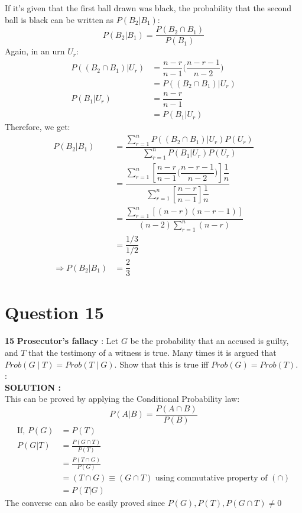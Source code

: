 \documentclass{article}
\begin{document}
If it's given that the first ball drawn was black, the probability that the second ball is black can be written as $P(B_2|B_1)$:
$$P(B_2|B_1) = \frac{P(B_2\cap B_1)}{P(B_1)}$$
Again, in an urn $U_r$:
\begin{align*}
P((B_2\cap B_1)|U_r)&=\dfrac{n-r}{n-1}\Big(\dfrac{n-r-1}{n-2}\Big)\\
&=P((B_2\cap B_1)|U_r)\\
P(B_1|U_r)&=\dfrac{n-r}{n-1}\\
&=P(B_1|U_r)
\end{align*}
Therefore, we get:
\begin{align*}
    P(B_2|B_1)&=\dfrac{\sum^n_{r=1}P((B_2\cap B_1)|U_r)P(U_r)}{\sum^n_{r=1}P(B_1|U_r)P(U_r)}\\
    &=\dfrac{\sum^n_{r=1}\left[\dfrac{n-r}{n-1}\Big(\dfrac{n-r-1}{n-2}\Big)\right]\dfrac{1}{n}}{\sum^n_{r=1}\left[\dfrac{n-r}{n-1}\right]\dfrac{1}{n}}\\
    &=\dfrac{\sum^n_{r=1}\left[(n-r)(n-r-1)\right]}{(n-2)\sum^n_{r=1}(n-r)}\\
    &=\dfrac{1/3}{1/2}\\
  \Rightarrow P(B_2|B_1)&=\dfrac{2}{3}
\end{align*}


\section{Question 15}
\label{Q15}
\textbf{15} \textbf{Prosecutor’s fallacy} : Let $G$ be the probability that an accused is guilty, and $T$ that the testimony of a witness is true. Many times it is argued that $Prob (G \mid T) = Prob (T \mid G)$. Show that this is true iff $Prob (G) = Prob (T).$ : \\ 

\hspace{1em} \large{\textbf{SOLUTION :}} \\
    This can be proved by applying the Conditional Probability law:
    $$P(A|B) = \frac{P(A\cap B)}{P(B)}$$
\begin{align*}
    \text{If, } P(G) &= P(T)\\
    P(G|T)&=\frac{P(G\cap T)}{P(T)}\\
    &=\frac{P(T\cap G)}{P(G)} \\
    &= (T \cap G) \equiv (G \cap T) \text{ using commutative property of } (\cap) \\
    &=P(T|G)
\end{align*}
The converse can also be easily proved since  $P(G),P(T),P(G\cap T)\neq0$
\end{document}
